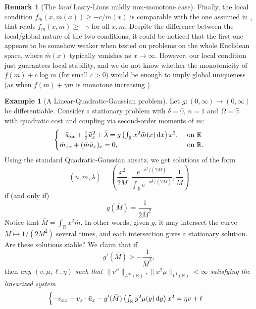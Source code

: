 \documentclass[10pt,a4paper,nouppercase,nowrite]{article}
\numberwithin{equation}{section}
\newcommand{\di}{{\rm d}}
\newcommand{\R}{\mathbb{R}}
\theoremstyle{definition}
\newtheorem{exmpl}[defn]{Example}
\newtheorem{rmk}[defn]{Remark}
\begin{document}
\begin{rmk}[The \textit{local} Lasry-Lions mildly non-monotone case]
Finally, the local condition $f_m(x,\bar{m}(x)) \ge -c/\bar m(x)$ is comparable with the one assumed in \cite{CP21}, that reads $f_m(x,m) \ge -\gamma$ for all $x,m$. Despite the difference between the local/global nature of the two conditions, it could be noticed that the first one appears to be somehow weaker when tested on problems on the whole Euclidean space, where $\bar{m}(x)$ typically vanishes as $x \to \infty$. However, our local condition just guarantees local stability, and we do not know whether the monotonicity of $f(m) + c\log m$ (for small $c > 0$) would be enough to imply global uniqueness (as when $f(m) + \gamma m$ is monotone increasing \cite{CP21}).
\end{rmk}


\begin{exmpl}[A Linear-Quadratic-Gaussian problem] \label{exg} Let $g:(0,\infty) \to (0,\infty)$ be differentiable. Consider a stationary problem with $\delta=0$, $n=1$ and $\Omega=\R$ with quadratic cost and coupling via second-order moments of $m$:
	\begin{equation*} \label{statg1}
		\begin{cases}
			-\bar u_{xx} + \frac{1}{2} \bar u_x^2 +\bar \lambda = g\left( \int_{\R} x^2 \bar m(x) \, \di x \right) x^2 ,& \text{ on } \R \\
			\bar m_{xx} + (\bar m \bar u_x)_x=0,& \text{ on } \R.
		\end{cases}
	\end{equation*}
Using the standard Quadratic-Gaussian ansatz, we get solutions of the form
\[
(\bar u, \bar m, \bar \lambda) = \left(\frac{x^2}{2 \bar M}, \frac{e^{-x^2 / (2\bar M)}}{\int_\R e^{-x^2 / (2\bar M)}}, \frac1{\bar M} \right)
\]
if (and only if)
\[
g(\bar M) = \frac{1}{2\bar M^2}
\]
Notice that $\bar M =  \int_{\R} x^2 \bar m$. In other words, given $g$, it may intersect the curve $M \mapsto 1/(2M^2)$ several times, and each intersection gives a stationary solution. Are these solutions stable? We claim that if
\begin{equation}\label{gprimecond}
g'(\bar M) > -\frac{1}{\bar M^3},
\end{equation}
then \textit{any $(v, \mu, \ell, \eta)$ such that $\|v''\|_{L^\infty(\R)}, \|x^2 \mu\|_{L^1(\R)} < \infty$ satisfying the linearized system}
\begin{equation} \label{firsteigsecg}
		\begin{cases}
			- v_{xx} + v_x \cdot \bar u_x - g'(\bar M) \left( \int_{\R} y^2 \mu(y) \, \di y \right) x^2= \eta v + \ell \\

\end{cases}
\end{equation}
\end{exmpl}
\end{document}
